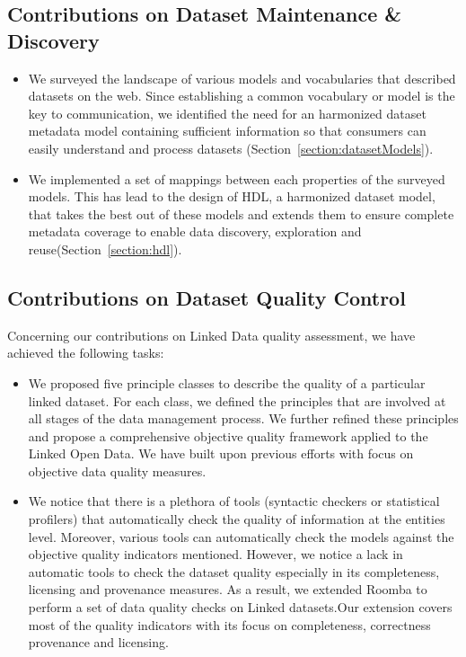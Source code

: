 \subsection{Contributions on Dataset Maintenance \& Discovery}

\begin{itemize}
	\item We surveyed the landscape of various models and vocabularies that described datasets on the web. Since establishing a common vocabulary or model is the key to communication, we identified the need for an harmonized dataset metadata model containing sufficient information so that consumers can easily understand and process datasets (Section~\ref{section:datasetModels}).
	\item We implemented a set of mappings between each properties of the surveyed models. This has lead to the design of HDL, a harmonized dataset model, that takes the best out of these models and extends them to ensure complete metadata coverage to enable data discovery, exploration and reuse(Section~\ref{section:hdl}).
\end{itemize}

\subsection{Contributions on Dataset Quality Control}
Concerning our contributions on Linked Data quality assessment, we have achieved the following tasks:
\begin{itemize}
	\item We proposed five principle classes to describe the quality of a particular linked dataset. For each class, we defined the principles that are involved at all stages of the data management process. We further refined these principles and propose a comprehensive objective quality framework applied to the Linked Open Data. We have built upon previous efforts with focus on objective data quality measures.
	\item We notice that there is a plethora of tools (syntactic checkers or statistical profilers) that automatically check the quality of information at the entities level. Moreover, various tools can automatically check the models against the objective quality indicators mentioned. However, we notice a lack in automatic tools to check the dataset quality especially in its completeness, licensing and provenance measures. As a result, we extended Roomba to perform a set of data quality checks on Linked datasets.Our extension covers most of the quality indicators with its focus on completeness, correctness provenance and licensing.
\end{itemize}


